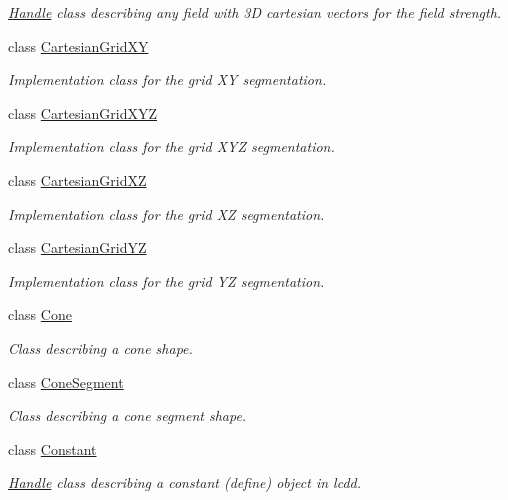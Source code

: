 \begin{DoxyCompactItemize}
\begin{DoxyCompactList}\small\item\em \hyperlink{class_d_d4hep_1_1_handle}{Handle} class describing any field with 3D cartesian vectors for the field strength. \end{DoxyCompactList}\item 
class \hyperlink{class_d_d4hep_1_1_geometry_1_1_cartesian_grid_x_y}{Cartesian\+Grid\+XY}
\begin{DoxyCompactList}\small\item\em Implementation class for the grid XY segmentation. \end{DoxyCompactList}\item 
class \hyperlink{class_d_d4hep_1_1_geometry_1_1_cartesian_grid_x_y_z}{Cartesian\+Grid\+X\+YZ}
\begin{DoxyCompactList}\small\item\em Implementation class for the grid X\+YZ segmentation. \end{DoxyCompactList}\item 
class \hyperlink{class_d_d4hep_1_1_geometry_1_1_cartesian_grid_x_z}{Cartesian\+Grid\+XZ}
\begin{DoxyCompactList}\small\item\em Implementation class for the grid XZ segmentation. \end{DoxyCompactList}\item 
class \hyperlink{class_d_d4hep_1_1_geometry_1_1_cartesian_grid_y_z}{Cartesian\+Grid\+YZ}
\begin{DoxyCompactList}\small\item\em Implementation class for the grid YZ segmentation. \end{DoxyCompactList}\item 
class \hyperlink{class_d_d4hep_1_1_geometry_1_1_cone}{Cone}
\begin{DoxyCompactList}\small\item\em Class describing a cone shape. \end{DoxyCompactList}\item 
class \hyperlink{class_d_d4hep_1_1_geometry_1_1_cone_segment}{Cone\+Segment}
\begin{DoxyCompactList}\small\item\em Class describing a cone segment shape. \end{DoxyCompactList}\item 
class \hyperlink{class_d_d4hep_1_1_geometry_1_1_constant}{Constant}
\begin{DoxyCompactList}\small\item\em \hyperlink{class_d_d4hep_1_1_handle}{Handle} class describing a constant (define) object in lcdd. \end{DoxyCompactList}\item 

\end{DoxyCompactItemize}

